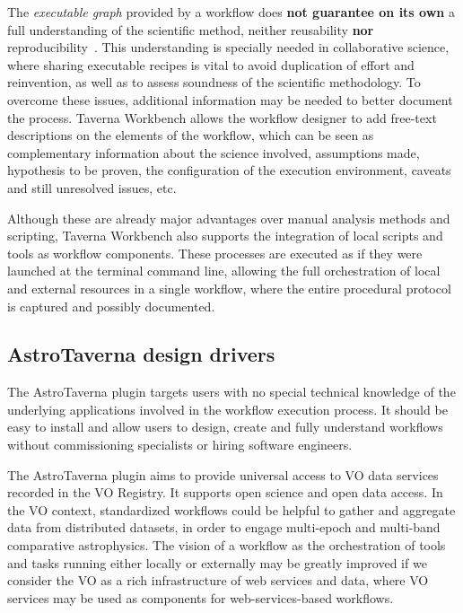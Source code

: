 \documentclass{aa}
\begin{document}
The \textit{executable graph} provided by a workflow does \textbf{not guarantee on its own} a full understanding of the scientific method, neither reusability \textbf{nor} reproducibility~\textbf{\citep{WfRO:SePublica2012}}. This understanding is specially needed in collaborative science, where sharing executable recipes is vital to avoid duplication of effort and reinvention, as well as to assess soundness of the scientific methodology. To overcome these issues, additional information may be needed to better document the process. Taverna Workbench allows the workflow designer to add free-text descriptions on the elements of the workflow, which can be seen as complementary information about the science involved, assumptions made, hypothesis to be proven, the configuration of the execution environment, caveats and still unresolved issues, etc.

Although these are already major advantages over manual analysis methods and scripting, Taverna Workbench also supports the integration of local scripts and tools as workflow components. These processes are executed as if they were launched at the terminal command line, allowing the full orchestration of local and external resources in a single workflow, where the entire procedural protocol is captured and possibly documented. 


\subsection{AstroTaverna design drivers}
\label{Drivers}

The AstroTaverna plugin targets users with no special technical knowledge of the underlying applications involved in the workflow execution process. It should be easy to install and allow users to design, create and fully understand workflows without commissioning specialists or hiring software engineers. 

The AstroTaverna plugin aims to provide universal access to VO data services recorded in the VO Registry. It supports open science and open data access. In the VO context, standardized workflows could be helpful to gather and aggregate data from distributed datasets, in order to engage multi-epoch and multi-band comparative astrophysics. The vision of a workflow as the orchestration of tools and tasks running either locally or externally may be greatly improved if we consider the VO as a rich infrastructure of web services and data, where VO services may be used as components for web-services-based workflows. 
\end{document}
